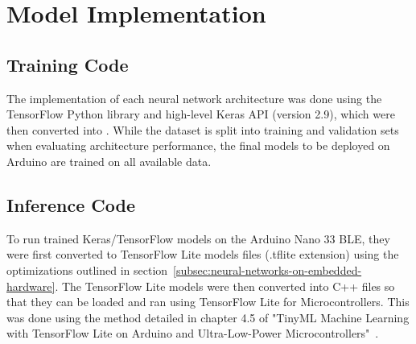 \section{Model Implementation}\label{sec:model-implementation}
\subsection{Training Code}\label{subsec:training-code}
The implementation of each neural network architecture was done using the TensorFlow Python library and high-level Keras API (version 2.9), which were then converted into .
While the dataset is split into training and validation sets when evaluating architecture performance, the final models to be deployed on Arduino are trained on all available data.

\subsection{Inference Code}\label{subsec:inference-code}
To run trained Keras/TensorFlow models on the Arduino Nano 33 BLE, they were first converted to TensorFlow Lite models files (.tflite extension) using the optimizations outlined in section~\ref{subsec:neural-networks-on-embedded-hardware}.
The TensorFlow Lite models were then converted into C++ files so that they can be loaded and ran using TensorFlow Lite for Microcontrollers.
This was done using the method detailed in chapter 4.5 of "TinyML Machine Learning with TensorFlow Lite on Arduino and Ultra-Low-Power Microcontrollers"~\cite{warden2020tinyml}.